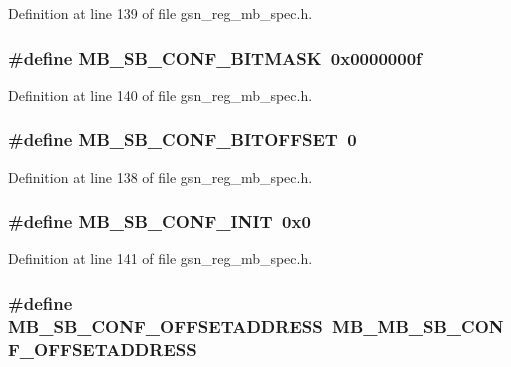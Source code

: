 Definition at line 139 of file gsn\_\-reg\_\-mb\_\-spec.h.

\hypertarget{a00562_a89b67538a8dcddb1e5a38b35a5d0da6d}{
\subsubsection[{MB\_\-SB\_\-CONF\_\-BITMASK}]{\setlength{\rightskip}{0pt plus 5cm}\#define MB\_\-SB\_\-CONF\_\-BITMASK~0x0000000f}}
\label{a00562_a89b67538a8dcddb1e5a38b35a5d0da6d}


Definition at line 140 of file gsn\_\-reg\_\-mb\_\-spec.h.

\hypertarget{a00562_a1e98b24ea5e1fecc721b5d9f3fa99dc7}{
\subsubsection[{MB\_\-SB\_\-CONF\_\-BITOFFSET}]{\setlength{\rightskip}{0pt plus 5cm}\#define MB\_\-SB\_\-CONF\_\-BITOFFSET~0}}
\label{a00562_a1e98b24ea5e1fecc721b5d9f3fa99dc7}


Definition at line 138 of file gsn\_\-reg\_\-mb\_\-spec.h.

\hypertarget{a00562_ac844cd38a00c745526162b908884b9d5}{
\subsubsection[{MB\_\-SB\_\-CONF\_\-INIT}]{\setlength{\rightskip}{0pt plus 5cm}\#define MB\_\-SB\_\-CONF\_\-INIT~0x0}}
\label{a00562_ac844cd38a00c745526162b908884b9d5}


Definition at line 141 of file gsn\_\-reg\_\-mb\_\-spec.h.

\hypertarget{a00562_ad928a3aaa38dbc6760a399a4ca4811f9}{
\subsubsection[{MB\_\-SB\_\-CONF\_\-OFFSETADDRESS}]{\setlength{\rightskip}{0pt plus 5cm}\#define MB\_\-SB\_\-CONF\_\-OFFSETADDRESS~MB\_\-MB\_\-SB\_\-CONF\_\-OFFSETADDRESS}}
\label{a00562_ad928a3aaa38dbc6760a399a4ca4811f9}


